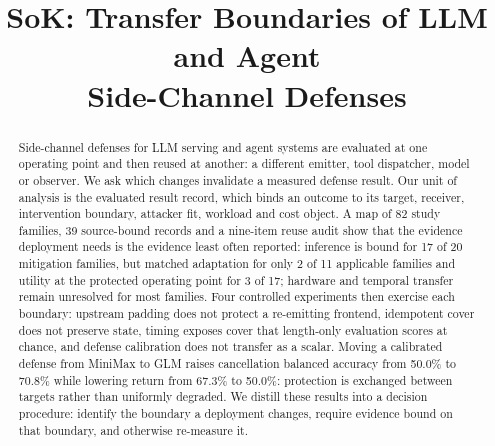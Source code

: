 \documentclass[conference,compsoc]{IEEEtran}
\title{SoK: Transfer Boundaries of LLM and Agent\\Side-Channel Defenses}
\author{}
\begin{document}
\maketitle

\begin{abstract}
Side-channel defenses for LLM serving and agent systems are evaluated at one operating point and then reused at another: a different emitter, tool dispatcher, model or observer. We ask which changes invalidate a measured defense result. Our unit of analysis is the evaluated result record, which binds an outcome to its target, receiver, intervention boundary, attacker fit, workload and cost object. A map of 82 study families, 39 source-bound records and a nine-item reuse audit show that the evidence deployment needs is the evidence least often reported: inference is bound for 17 of 20 mitigation families, but matched adaptation for only 2 of 11 applicable families and utility at the protected operating point for 3 of 17; hardware and temporal transfer remain unresolved for most families. Four controlled experiments then exercise each boundary: upstream padding does not protect a re-emitting frontend, idempotent cover does not preserve state, timing exposes cover that length-only evaluation scores at chance, and defense calibration does not transfer as a scalar. Moving a calibrated defense from MiniMax to GLM raises cancellation balanced accuracy from 50.0\% to 70.8\% while lowering return from 67.3\% to 50.0\%: protection is exchanged between targets rather than uniformly degraded. We distill these results into a decision procedure: identify the boundary a deployment changes, require evidence bound on that boundary, and otherwise re-measure it.
\end{abstract}















\appendices







\end{document}

